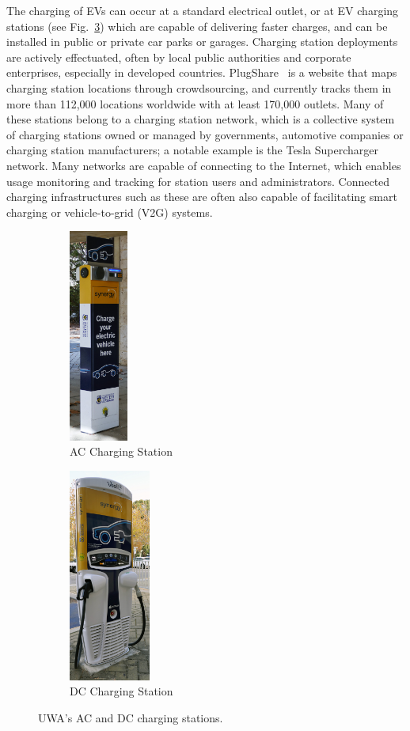 The charging of EVs can occur at a standard electrical outlet, or at EV charging stations (see Fig.~\ref{fig:1:cs}) which are capable of delivering faster charges, and can be installed in public or private car parks or garages. Charging station deployments are actively effectuated, often by local public authorities and corporate enterprises, especially in developed countries. PlugShare~\cite{plugshare_plugshare_nodate} is a website that maps charging station locations through crowdsourcing, and currently tracks them in more than 112,000 locations worldwide with at least 170,000 outlets. Many of these stations belong to a charging station network, which is a collective system of charging stations owned or managed by governments, automotive companies or charging station manufacturers; a notable example is the Tesla Supercharger~\cite{tesla_supercharger_nodate} network. Many networks are capable of connecting to the Internet, which enables usage monitoring and tracking for station users and administrators. Connected charging infrastructures such as these are often also capable of facilitating smart charging or vehicle-to-grid (V2G) systems. 

\begin{figure}[ht]
	\centering
	\begin{subfigure}[b]{0.45\textwidth}
		\centering
		\includegraphics[height=7cm]{accs}
		\caption{AC Charging Station}
		\label{fig:1:accs}   
	\end{subfigure} 
	\hspace{1em}         
	\begin{subfigure}[b]{0.45\textwidth}
		\centering
		\includegraphics[height=7cm]{dccs}
		\caption{DC Charging Station}
		\label{fig:1:dccs}
	\end{subfigure}             
	\caption{UWA's AC and DC charging stations.}
	\label{fig:1:cs}
\end{figure}


